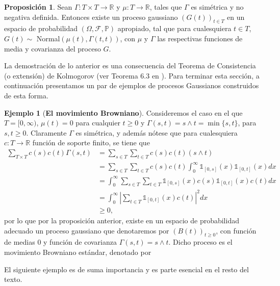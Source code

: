 \documentclass[letterpaper,twoside]{book}
\newcommand{\R}{\mathbb{R}}
\newcommand{\F}{\mathcal{F}}
\renewcommand{\P}{\mathbb{P}}
\newcommand{\1}{\mathds{1}}
\newcommand{\abs}[1]{\left\lvert #1 \right\rvert}
\renewcommand{\to}{\rightarrow}
\theoremstyle{definition}
\theoremstyle{definition}
\theoremstyle{definition}
\theoremstyle{definition}
\newtheorem{prop}{Proposición}
\theoremstyle{definition}
\theoremstyle{definition}
\newtheorem{ejem}{Ejemplo}
\theoremstyle{definition}
\begin{document}
\begin{prop} 
 Sean $\Gamma:T\times T\to \R$ y $\mu:T\to \R$, tales que $\Gamma$ es simétrica y no negativa definida. Entonces existe un proceso gaussiano $(G(t))_{t\in T}$ en un espacio de probabilidad $(\Omega, \F,\P)$ apropiado, tal que para cualesquiera $t\in T$, $G(t)\sim$ Normal$(\mu(t),\Gamma(t,t))$, con $\mu$ y $\Gamma$ las respectivas funciones de media y covarianza del proceso $G$.
 \end{prop}
 La demostración de lo anterior es una consecuencia del Teorema de Consistencia (o extensión) de Kolmogorov (ver Teorema 6.3 en \cite{LeGall2016} ). Para terminar esta sección, a continuación presentamos un par de ejemplos de procesos Gaussianos construidos de esta forma.
\begin{ejem}[\textbf{El movimiento Browniano}]
Consideremos el caso en el que $T=[0,\infty)$, $\mu(t)=0$ para cualquier $t\geq0$ y $\Gamma(s,t)=s\wedge t=\min\{s,t\}$, para $s,t\geq0$. Claramente $\Gamma$ es simétrica, y además nótese que para cualesquiera $c:T\to\R$ función de soporte finito, se tiene que
\begin{align*}
\sum_{T\times T}^{}c(s)c(t)\Gamma(s,t)&=\sum_{s\in T}^{}\sum_{t\in T}c(s)c(t)(s\wedge t)\\
&=\sum_{s\in T}^{}\sum_{t\in T}c(s)c(t)\int_{0}^{\infty}\1_{[0,s]}(x)\1_{[0,t]}(x)dx\\
&=\int_{0}^{\infty}\sum_{s\in T}\sum_{t\in T}\1_{[0,s]}(x)c(s)\1_{[0,t]}(x)c(t)dx\\
&=\int_{0}^{\infty}\abs{\sum_{t\in T}\1_{[0,t]}(x)c(t)}^2dx\\
&\geq0,
\end{align*}
por lo que por la proposición anterior, existe en un espacio de probabilidad adecuado un proceso gaussiano que denotaremos por $(B(t))_{t\geq0}$, con función de medias 0 y función de covarianza $\Gamma(s,t)=s\wedge t$. Dicho proceso es el movimiento Browniano estándar, denotado por 
 \end{ejem}
El siguiente ejemplo es de suma importancia y es parte esencial en el resto del texto.
\end{document}
